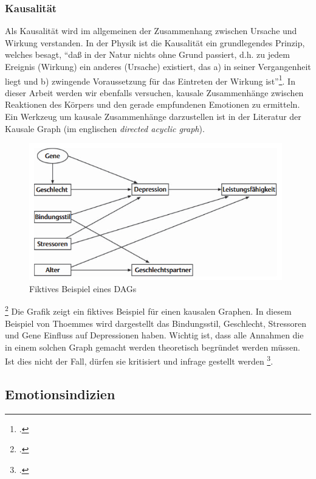 \subsubsection{Kausalität}
Als Kausalität wird im allgemeinen der Zusammenhang zwischen Ursache und Wirkung verstanden. In der Physik ist die Kausalität ein grundlegendes Prinzip, welches besagt, ``daß in der Natur nichts ohne Grund passiert, d.h. zu jedem Ereignis (Wirkung) ein anderes (Ursache) existiert, das a) in seiner Vergangenheit liegt und b) zwingende Voraussetzung für das Eintreten der Wirkung ist''\footcite{Sav18}.\newline
In dieser Arbeit werden wir ebenfalls versuchen, kausale Zusammenhänge zwischen Reaktionen des Körpers und den gerade empfundenen Emotionen zu ermitteln.
Ein Werkzeug um kausale Zusammenhänge darzustellen ist in der Literatur der Kausale Graph (im englischen \textit{directed acyclic graph}).
\begin{figure}[h]
	\centering
	\includegraphics[width=11cm]{Bilder/dag.png}
	\caption[Fiktives Beispiel eines DAGs]{Fiktives Beispiel eines DAGs\footnotemark}
\end{figure}
\footcite[Vgl.][Kausale Graphen - DAGs]{Tho11}
Die Grafik zeigt ein fiktives Beispiel für einen kausalen Graphen. In diesem Beispiel von Thoemmes wird dargestellt das Bindungsstil, Geschlecht, Stressoren und Gene Einfluss auf Depressionen haben. Wichtig ist, dass alle Annahmen die in einem solchen Graph gemacht werden theoretisch begründet werden müssen. Ist dies nicht der Fall, dürfen sie kritisiert und infrage gestellt werden \footcite[Vgl. ][S.3 Kausale Graphen - DAGs]{Tho11}.
\subsection{Emotionsindizien}
